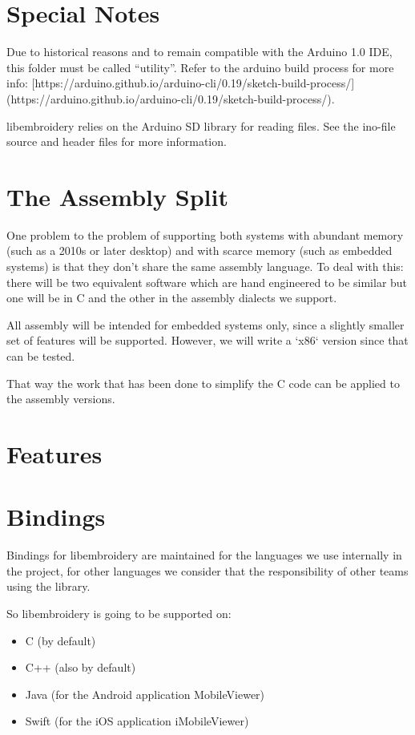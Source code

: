 \documentclass{report}
\begin{document}
\section{Special Notes}

Due to historical reasons and to remain compatible with the Arduino 1.0
IDE, this folder must be called ``utility''. Refer to the arduino build
process for more info:
[https://arduino.github.io/arduino-cli/0.19/sketch-build-process/](https://arduino.github.io/arduino-cli/0.19/sketch-build-process/).

libembroidery relies on the Arduino SD library for reading files. See
the ino-file source and header files for more information.

\section{The Assembly Split}

One problem to the problem of supporting both systems with abundant memory
(such as a 2010s or later desktop) and with scarce memory (such as embedded
systems) is that they don't share the same assembly language. To deal with
this: there will be two equivalent software which are hand engineered to be
similar but one will be in C and the other in the assembly dialects we support.

All assembly will be intended for embedded systems only, since a slightly
smaller set of features will be supported. However, we will write a
`x86` version since that can be tested.

That way the work that has been done to simplify the C code can be applied to
the assembly versions.

\section{Features}

\section{Bindings}

Bindings for libembroidery are maintained for the languages we use internally in the project, for other languages we consider that the responsibility of other teams using the library.

So libembroidery is going to be supported on:

\begin{itemize}
\item C (by default)
\item C++ (also by default)
\item Java (for the Android application MobileViewer)
\item Swift (for the iOS application iMobileViewer)
\end{itemize}
\end{document}
